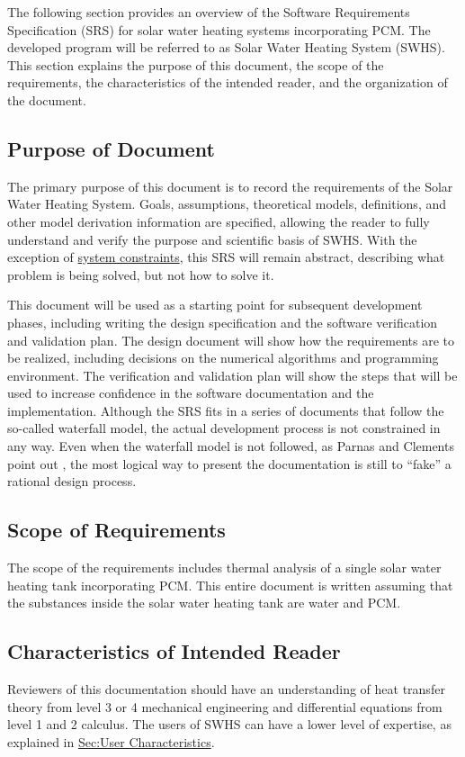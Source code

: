 \documentclass[12pt]{article}
\begin{document}
The following section provides an overview of the Software Requirements Specification (SRS) for solar water heating systems incorporating PCM. The developed program will be referred to as Solar Water Heating System (SWHS). This section explains the purpose of this document, the scope of the requirements, the characteristics of the intended reader, and the organization of the document.

\subsection{Purpose of Document}
\label{Sec:DocPurpose}
The primary purpose of this document is to record the requirements of the Solar Water Heating System. Goals, assumptions, theoretical models, definitions, and other model derivation information are specified, allowing the reader to fully understand and verify the purpose and scientific basis of SWHS. With the exception of \hyperref[Sec:SysConstraints]{system constraints}, this SRS will remain abstract, describing what problem is being solved, but not how to solve it.

This document will be used as a starting point for subsequent development phases, including writing the design specification and the software verification and validation plan. The design document will show how the requirements are to be realized, including decisions on the numerical algorithms and programming environment. The verification and validation plan will show the steps that will be used to increase confidence in the software documentation and the implementation. Although the SRS fits in a series of documents that follow the so-called waterfall model, the actual development process is not constrained in any way. Even when the waterfall model is not followed, as Parnas and Clements point out \cite{parnasClements1986}, the most logical way to present the documentation is still to ``fake'' a rational design process.

\subsection{Scope of Requirements}
\label{Sec:ReqsScope}
The scope of the requirements includes thermal analysis of a single solar water heating tank incorporating PCM. This entire document is written assuming that the substances inside the solar water heating tank are water and PCM.

\subsection{Characteristics of Intended Reader}
\label{Sec:ReaderChars}
Reviewers of this documentation should have an understanding of heat transfer theory from level 3 or 4 mechanical engineering and differential equations from level 1 and 2 calculus. The users of SWHS can have a lower level of expertise, as explained in \hyperref[Sec:UserChars]{Sec:User Characteristics}.
\end{document}
